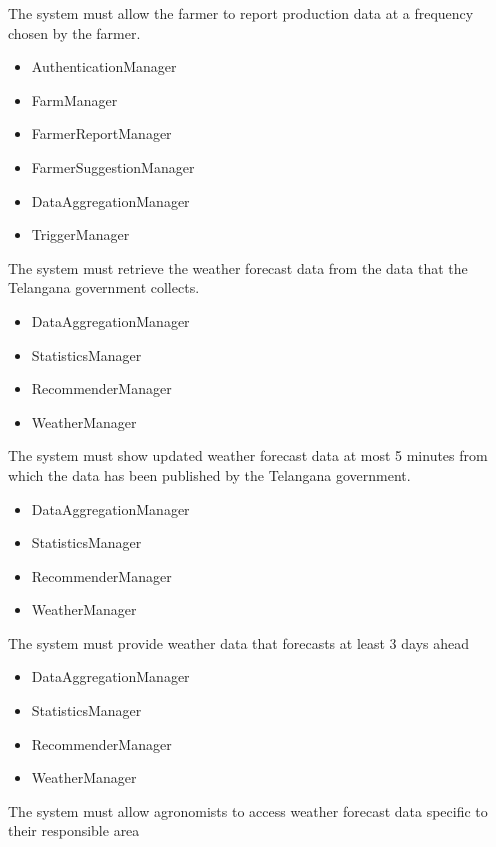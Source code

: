 \begin{itemize}
\begin{itemize}
\end{itemize}
 The system must allow the farmer to report production data at a frequency chosen by the farmer.
\begin{itemize}

\item AuthenticationManager
\item FarmManager
\item FarmerReportManager
\item FarmerSuggestionManager
\item DataAggregationManager
\item TriggerManager

\end{itemize}
 The system must retrieve the weather forecast data from the data that the Telangana government collects.
\begin{itemize}


\item DataAggregationManager
\item StatisticsManager
\item RecommenderManager
\item WeatherManager

\end{itemize}
 The system must show updated weather forecast data at most 5 minutes from which the data has been published by the Telangana government.
\begin{itemize}


\item DataAggregationManager
\item StatisticsManager
\item RecommenderManager
\item WeatherManager

\end{itemize}
 The system must provide weather data that forecasts at least 3 days ahead
\begin{itemize}

\item DataAggregationManager
\item StatisticsManager
\item RecommenderManager
\item WeatherManager

\end{itemize}
 The system must allow agronomists to access weather forecast data specific to their responsible area
\begin{itemize}



\end{itemize}
\end{itemize}
